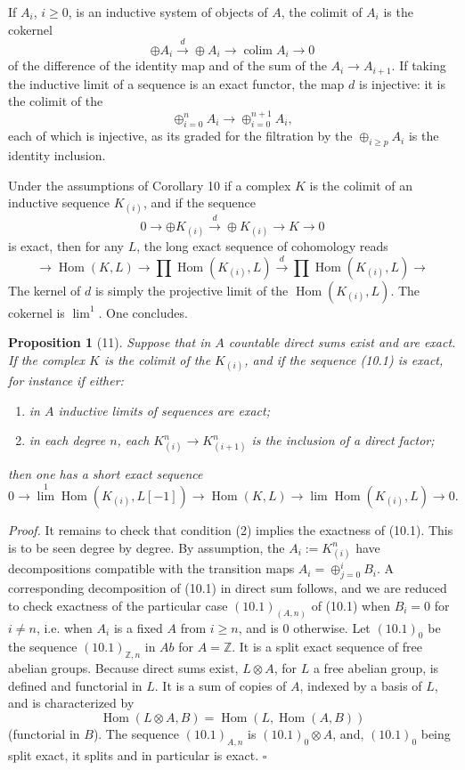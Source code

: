 \documentclass[11pt]{article}
\newcommand{\Z}{\mathbb Z}
\newcommand{\Hom}{\operatorname{Hom}}
\theoremstyle{deligne}
\newtheorem*{proposition*}{Proposition}
\newenvironment{proofdel}{\noindent\textit{Proof.}}{\hfill$\square$}
\begin{document}
If \(A_i\), \(i\ge0\), is an inductive system of objects of \(A\), the colimit of \(A_i\) is the cokernel
\[
\oplus A_i\overset{d}{\longrightarrow}\oplus A_i\longrightarrow \operatorname{colim}A_i\longrightarrow0
\]
of the difference of the identity map and of the sum of the \(A_i\to A_{i+1}\). If taking the inductive limit of a sequence is an exact functor, the map \(d\) is injective: it is the colimit of the
\[
\oplus_{i=0}^n A_i\longrightarrow \oplus_{i=0}^{n+1}A_i,
\]
each of which is injective, as its graded for the filtration by the \(\oplus_{i\ge p}A_i\) is the identity inclusion.

Under the assumptions of Corollary 10 if a complex \(K\) is the colimit of an inductive sequence \(K_{(i)}\), and if the sequence
\[
0\longrightarrow\oplus K_{(i)}\overset{d}{\longrightarrow}\oplus K_{(i)}\longrightarrow K\longrightarrow0 \tag{10.1}
\]
is exact, then for any \(L\), the long exact sequence of cohomology reads
\[
\longrightarrow \Hom(K,L)\longrightarrow\prod\Hom(K_{(i)},L)
 \overset{d}{\longrightarrow}\prod\Hom(K_{(i)},L)\longrightarrow
\]
The kernel of \(d\) is simply the projective limit of the \(\Hom(K_{(i)},L)\). The cokernel is \(\operatorname{lim}^1\). One concludes.

\begin{proposition*}[11]
Suppose that in \(A\) countable direct sums exist and are exact. If the complex \(K\) is the colimit of the \(K_{(i)}\), and if the sequence (10.1) is exact, for instance if either:
\begin{enumerate}[label=\arabic*.]
\item in \(A\) inductive limits of sequences are exact;
\item in each degree \(n\), each \(K^n_{(i)}\to K^n_{(i+1)}\) is the inclusion of a direct factor;
\end{enumerate}
then one has a short exact sequence
\[
0\longrightarrow\operatorname{lim}^1\Hom(K_{(i)},L[-1])
\longrightarrow\Hom(K,L)
\longrightarrow\operatorname{lim}\Hom(K_{(i)},L)\longrightarrow0.
\]
\end{proposition*}

\begin{proofdel}
It remains to check that condition (2) implies the exactness of (10.1). This is to be seen degree by degree. By assumption, the \(A_i:=K^n_{(i)}\) have decompositions compatible with the transition maps \(A_i=\oplus_{j=0}^i B_i\). A corresponding decomposition of (10.1) in direct sum follows, and we are reduced to check exactness of the particular case \((10.1)_{(A,n)}\) of (10.1) when \(B_i=0\) for \(i\ne n\), i.e. when \(A_i\) is a fixed \(A\) from \(i\ge n\), and is \(0\) otherwise. Let \((10.1)_0\) be the sequence \((10.1)_{\Z,n}\) in \(Ab\) for \(A=\Z\). It is a split exact sequence of free abelian groups. Because direct sums exist, \(L\otimes A\), for \(L\) a free abelian group, is defined and functorial in \(L\). It is a sum of copies of \(A\), indexed by a basis of \(L\), and is characterized by
\[
\Hom(L\otimes A,B)=\Hom(L,\Hom(A,B))
\]
(functorial in \(B\)). The sequence \((10.1)_{A,n}\) is \((10.1)_0\otimes A\), and, \((10.1)_0\) being split exact, it splits and in particular is exact.
\end{proofdel}
\end{document}

